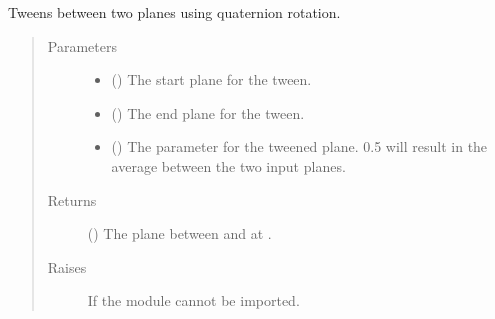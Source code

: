 \documentclass[letterpaper,10pt,english]{sphinxmanual}
\begin{document}
\begin{fulllineitems}
\label{\detokenize{cockatoo:cockatoo.utilities.tween_planes}}
Tweens between two planes using quaternion rotation.
\begin{quote}\begin{description}
\item[{Parameters}] \leavevmode\begin{itemize}
\item {} 
 () \textendash{} The start plane for the tween.

\item {} 
 () \textendash{} The end plane for the tween.

\item {} 
 () \textendash{} The parameter for the tweened plane. 0.5 will result in the average
between the two input planes.

\end{itemize}

\item[{Returns}] \leavevmode
{} () \textendash{} The plane between  and  at .

\item[{Raises}] \leavevmode
{\hyperref[\detokenize{cockatoo:cockatoo.exception.SystemNotPresentError}]{}} \textendash{} If the  module cannot be imported.

\end{description}\end{quote}

\end{fulllineitems}

\end{document}
